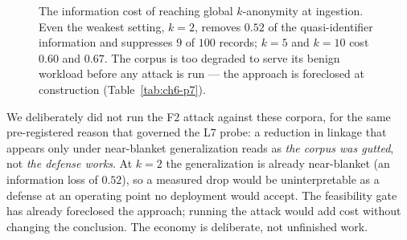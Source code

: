 \documentclass[11pt,a4paper]{report}
\begin{document}
\begin{figure}[h]
\centering
{}
\caption[The information cost of ingestion-time $k$-anonymity (P7)]{The information cost of
reaching global $k$-anonymity at ingestion. Even the weakest setting, $k{=}2$, removes $0.52$ of
the quasi-identifier information and suppresses $9$ of $100$ records; $k{=}5$ and $k{=}10$ cost
$0.60$ and $0.67$. The corpus is too degraded to serve its benign workload before any attack is
run --- the approach is foreclosed at construction (Table~\ref{tab:ch6-p7}).}
\label{fig:ch6-p7infoloss}
\end{figure}

We deliberately did not run the F2 attack against these corpora, for the same pre-registered reason that
governed the L7 probe: a reduction in linkage that appears only under near-blanket generalization reads as
\emph{the corpus was gutted}, not \emph{the defense works}. At $k=2$ the generalization is already
near-blanket (an information loss of $0.52$), so a measured drop would be uninterpretable as a defense at
an operating point no deployment would accept. The feasibility gate has already foreclosed the approach;
running the attack would add cost without changing the conclusion. The economy is deliberate, not
unfinished work.
\end{document}
